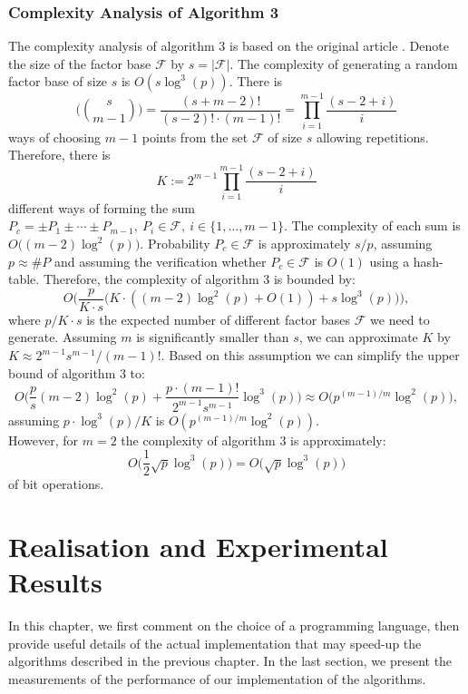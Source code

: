 \documentclass[thesis=M,english]{FITthesis}[2012/10/20]
\theoremstyle{remark}
\theoremstyle{definition}
\begin{document}
\subsection{Complexity Analysis of Algorithm 3}
The complexity analysis of algorithm 3 is based on the original article \cite{guire}.
Denote the size of the factor base $\mathcal{F}$ by $s = |\mathcal{F}|$. The complexity of generating a random factor base of size $s$ is $O(s\log^3(p))$. There is 
$$
\Bigg(\binom{s}{m-1}\Bigg) = \frac{(s + m - 2)!}{(s-2)!\cdot (m-1)!} = \prod_{i=1}^{m-1} \frac{(s -2 + i)}{i}
$$
ways of choosing $m-1$ points from the set $\mathcal{F}$ of size $s$ allowing repetitions. Therefore, there is
 $$
 K:= 2^{m-1}\prod_{i=1}^{m-1} \frac{(s -2 + i)}{i}
 $$
 different ways of forming the sum $P_c = \pm P_1 \pm \cdots \pm P_{m-1},\ P_i \in \mathcal{F},\ i \in \{1,\ldots,m-1\}.$ The complexity of each sum is $O\big((m-2)\log^2(p)\big)$. Probability $P_c \in \mathcal{F}$ is approximately $s/p$, assuming $p \approx \#P$ and assuming the verification whether $P_c \in \mathcal{F}$ is $O(1)$ using a hash-table. Therefore, the complexity of algorithm 3 is bounded by:
 $$
 O\Bigg(\frac{p}{K\cdot s}\bigg( K\cdot\left((m-2)\log^2(p)+ O(1)\right) + s\log^3(p)\bigg)\Bigg),
 $$
where $p/K\cdot s$ is the expected number of different factor bases $\mathcal{F}$ we need to generate. Assuming $m$ is significantly smaller than $s$, we can approximate $K$ by $K \approx 2^{m-1}s^{m-1}/(m-1)!.$ Based on this assumption we can simplify the upper bound of algorithm 3 to:
$$
O\Bigg( \frac{p}{s}(m-2)\log^2(p) + \frac{p\cdot (m-1)!}{2^{m-1}s^{m-1}}\log^3(p)\Bigg) \approx O\Bigg(p^{(m-1)/m}\log^2(p)\Bigg),
$$
assuming $p\cdot \log^3(p)/K$ is $O(p^{(m-1)/m}\log^2(p))$.
\\
\noindent However, for $m=2$ the complexity of algorithm 3 is approximately:
$$
O\Bigg( \frac{1}{2}\sqrt{p}\log^3(p)\Bigg) = O\Bigg(\sqrt{p}\log^3(p)\Bigg)
$$ of bit operations. \\
\chapter{Realisation and Experimental Results}\label{ch4}
In this chapter, we first comment on the choice of a programming language, then provide useful details of the actual implementation that may speed-up the algorithms described in the previous chapter. In the last section, we present the measurements of the performance of our implementation of the algorithms.
\end{document}

